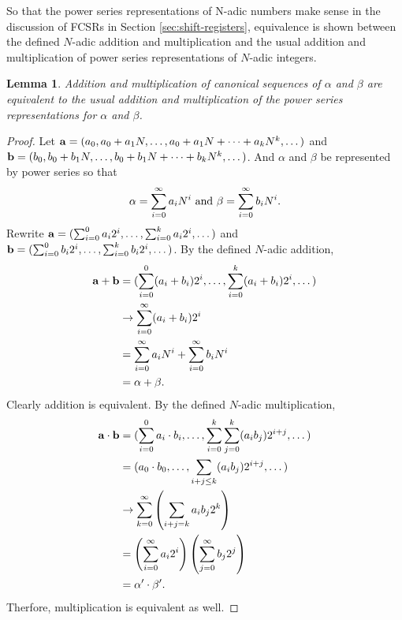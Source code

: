 \documentclass[english]{article}
\theoremstyle{plain}
\newtheorem{lemma}[theorem]{Lemma}%
\theoremstyle{definition}
\theoremstyle{remark}
\begin{document}
\par So that the power series representations of N-adic numbers make sense in
the discussion of FCSRs in Section \ref{sec:shift-registers}, equivalence is
shown between the defined $N$-adic addition and multiplication and the usual
addition and multiplication of power series representations of $N$-adic
integers.

\begin{lemma}
  Addition and multiplication of canonical sequences of $\alpha$ and $\beta$ are
  equivalent to the usual addition and multiplication of the power series
  representations for $\alpha$ and $\beta$.
\end{lemma}
\begin{proof}
  Let ${\bf a}=(a_0,a_0+a_1N,\dots,a_0+a_1N+\cdots+a_kN^k,\dots)$
  and ${\bf b}=(b_0,b_0+b_1N,\dots,b_0+b_1N+\cdots+b_kN^k,\dots)$. And $\alpha$
  and $\beta$ be represented by power series so that
  \[
    \alpha=\sum_{i=0}^\infty a_iN^i{\rm \ and\ } \beta=\sum_{i=0}^\infty b_iN^i.
  \]
  Rewrite ${\bf a}=(\sum_{i=0}^0a_i2^i,\dots,\sum_{i=0}^ka_i2^i,\dots)$ and
  ${\bf b}=(\sum_{i=0}^0b_i2^i,\dots,\sum_{i=0}^kb_i2^i,\dots)$. By the defined
  $N$-adic addition,
  \begin{align*}
    {\bf a}+{\bf b}&=(\sum_{i=0}^0(a_i+b_i)2^i,\dots,\sum_{i=0}^k(a_i+b_i)2^i,\dots)\\
                &\rightarrow\sum_{i=0}^\infty(a_i+b_i)2^i\\
                &=\sum_{i=0}^\infty a_iN^i + \sum_{i=0}^\infty b_iN^i\\
                &=\alpha+\beta.
  \end{align*}
  Clearly addition is equivalent. By the defined $N$-adic multiplication,
  \begin{align*}
    {\bf a}\cdot{\bf b}
      &=(\sum_{i=0}^0a_i\cdot b_i,\dots,\sum_{i=0}^k\sum_{j=0}^k(a_ib_j)2^{i+j},\dots)\\
      &=(a_0\cdot b_0,\dots,\sum_{i+j\leq k}(a_ib_j)2^{i+j},\dots)\\
      &\rightarrow\sum_{k=0}^\infty\left(\sum_{i+j=k}a_ib_j2^k\right)\\
      &=\left(\sum_{i=0}^\infty a_i2^i\right)\left(\sum_{j=0}^\infty b_j2^j\right)\\
      &=\alpha'\cdot\beta'.
  \end{align*}
  Therfore, multiplication is equivalent as well.
\end{proof}
\end{document}
